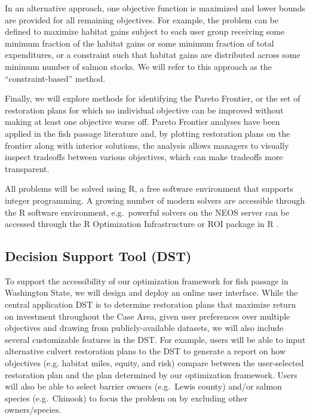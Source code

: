 \documentclass[12pt]{elsarticle}
\begin{document}
In an alternative approach, one objective function is maximized and lower bounds are provided for all remaining objectives. For example, the problem can be defined to maximize habitat gains subject to each user group receiving some minimum fraction of the habitat gains or some minimum fraction of total expenditures, or a constraint such that habitat gains are distributed across some minimum number of salmon stocks. We will refer to this approach as the ``constraint-based'' method.

Finally, we will explore methods for identifying the Pareto Frontier, or the set of restoration plans for which no individual objective can be improved without making at least one objective worse off. Pareto Frontier analyses have been applied in the fish passage literature \citep[e.g.][]{couto_safeguarding_2021} and, by plotting restoration plans on the frontier along with interior solutions, the analysis allows managers to visually inspect tradeoffs between various objectives, which can make tradeoffs more transparent.

All problems will be solved using R, a free software environment that supports integer programming. A growing number of modern solvers are accessible through the R software environment, e.g.\ powerful solvers on the NEOS server can be accessed through the R Optimization Infrastructure or ROI package in R \citep{theussl2019roi}.

\subsection*{Decision Support Tool (DST)}

To support the accessibility of our optimization framework for fish passage in Washington State, we will design and deploy an online user interface. While the central application DST is to determine restoration plans that maximize return on investment throughout the Case Area, given user preferences over multiple objectives and drawing from publicly-available datasets, we will also include several customizable features in the DST. For example, users will be able to input alternative culvert restoration plans to the DST to generate a report on how objectives (e.g. habitat miles, equity, and risk) compare between the user-selected restoration plan and the plan determined by our optimization framework. Users will also be able to select barrier owners (e.g.\ Lewis county) and/or salmon species (e.g.\ Chinook) to focus the problem on by excluding other owners/species. 
\end{document}
